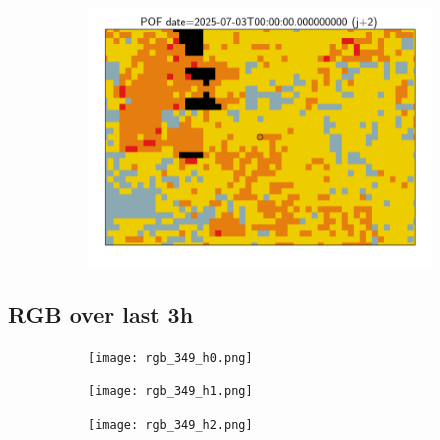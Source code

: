 \documentclass{article}
\begin{document}
\begin{figure}[H]
\begin{subfigure}[b]{0.31\textwidth}
    \end{subfigure}
    \begin{subfigure}[b]{0.36\textwidth}
        \centering
        \includegraphics[width=0.85\linewidth]{pof_349_j2.png} %
    \end{subfigure}
\end{figure}


\vspace{-1em}
\subsection*{RGB over last 3h}
\vspace{-1em}
\begin{figure}[H]
    \centering
    \begin{subfigure}[b]{0.32\textwidth}
        \centering
        \texttt{[image: rgb\_349\_h0.png]} %
    \end{subfigure}
    \begin{subfigure}[b]{0.32\textwidth}
        \centering
        \texttt{[image: rgb\_349\_h1.png]} %
    \end{subfigure}
    \begin{subfigure}[b]{0.32\textwidth}
        \centering
        \texttt{[image: rgb\_349\_h2.png]} %
    \end{subfigure}
\end{figure}
\end{document}
